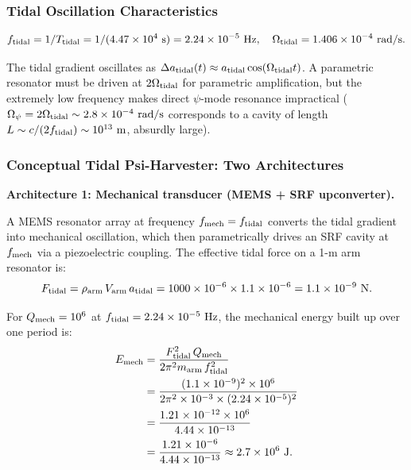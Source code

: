 \documentclass[aps,prd,twocolumn,superscriptaddress]{revtex4-2}
\newcommand{\Opsi}{\Omega_\psi}
\begin{document}
\subsubsection{Tidal Oscillation Characteristics}

\begin{equation}
f_{\rm tidal} = 1/T_{\rm tidal} = 1/(4.47\times 10^4~\mathrm{s}) = 2.24\times 10^{-5}~\mathrm{Hz},
\quad
\Omega_{\rm tidal} = 1.406\times 10^{-4}~\mathrm{rad/s}.
\end{equation}

The tidal gradient oscillates as $\Delta a_{\rm tidal}(t) \approx
a_{\rm tidal}\cos(\Omega_{\rm tidal}t)$.  A parametric resonator must
be driven at $2\Omega_{\rm tidal}$ for parametric amplification, but the
extremely low frequency makes direct $\psi$-mode resonance impractical
($\Opsi = 2\Omega_{\rm tidal} \sim 2.8\times 10^{-4}~\mathrm{rad/s}$
corresponds to a cavity of length $L \sim c/(2f_{\rm tidal}) \sim 10^{13}~\mathrm{m}$,
absurdly large).

\subsubsection{Conceptual Tidal Psi-Harvester: Two Architectures}

\textbf{Architecture 1: Mechanical transducer (MEMS + SRF upconverter).}

A MEMS resonator array at frequency $f_{\rm mech} = f_{\rm tidal}$
converts the tidal gradient into mechanical oscillation, which then
parametrically drives an SRF cavity at $f_{\rm mech}$ via a
piezoelectric coupling.  The effective tidal force on a 1-m arm resonator is:
\begin{equation}
F_{\rm tidal} = \rho_{\rm arm}\,V_{\rm arm}\,a_{\rm tidal}
= 1000\times 10^{-6}\times 1.1\times 10^{-6} = 1.1\times 10^{-9}~\mathrm{N}.
\end{equation}

For $Q_{\rm mech} = 10^6$ at $f_{\rm tidal} = 2.24\times 10^{-5}~\mathrm{Hz}$,
the mechanical energy built up over one period is:
\begin{align}
E_{\rm mech} &= \frac{F_{\rm tidal}^2\,Q_{\rm mech}}{2\pi^2 m_{\rm arm}\,f_{\rm tidal}^2} \notag\\
&= \frac{(1.1\times 10^{-9})^2\times 10^6}{2\pi^2\times 10^{-3}\times(2.24\times 10^{-5})^2} \notag\\
&= \frac{1.21\times 10^{-12}\times 10^6}{4.44\times 10^{-13}} \notag\\
&= \frac{1.21\times 10^{-6}}{4.44\times 10^{-13}} \approx 2.7\times 10^{6}~\mathrm{J}.
\end{align}
\end{document}

